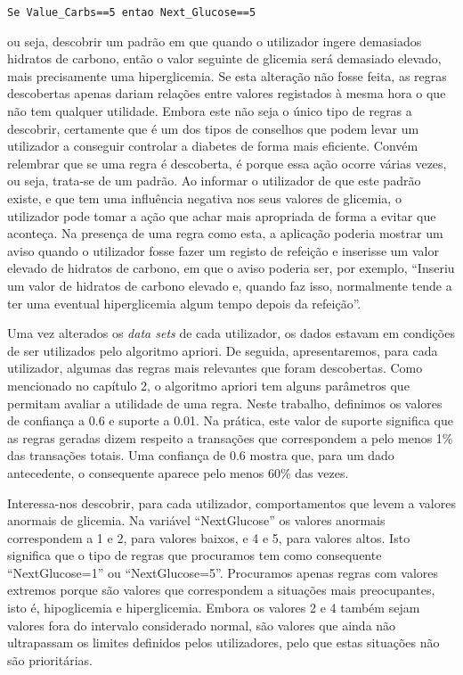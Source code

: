 \begin{lstlisting}
Se Value_Carbs==5 entao Next_Glucose==5
\end{lstlisting} 
ou seja, descobrir um padrão em que quando o utilizador ingere demasiados hidratos de carbono, então o valor seguinte de glicemia será demasiado elevado, mais precisamente uma hiperglicemia. Se esta alteração não fosse feita, as regras descobertas apenas dariam relações entre valores registados à mesma hora o que não tem qualquer utilidade. Embora este não seja o único tipo de regras a descobrir, certamente que é um dos tipos de conselhos que podem levar um utilizador a conseguir controlar a diabetes de forma mais eficiente. Convém relembrar que se uma regra é descoberta, é porque essa ação ocorre várias vezes, ou seja, trata-se de um padrão. Ao informar o utilizador de que este padrão existe, e que tem uma influência negativa nos seus valores de glicemia, o utilizador pode tomar a ação que achar mais apropriada de forma a evitar que aconteça. Na presença de uma regra como esta, a aplicação poderia mostrar um aviso quando o utilizador fosse fazer um registo de refeição e inserisse um valor elevado de hidratos de carbono, em que o aviso poderia ser, por exemplo, ``Inseriu um valor de hidratos de carbono elevado e, quando faz isso, normalmente tende a ter uma eventual hiperglicemia algum tempo depois da refeição''.

Uma vez alterados os \textit{data sets} de cada utilizador, os dados estavam em condições de ser utilizados pelo algoritmo apriori. De seguida, apresentaremos, para cada utilizador, algumas das regras mais relevantes que foram descobertas. Como mencionado no capítulo 2, o algoritmo apriori tem alguns parâmetros que permitam avaliar a utilidade de uma regra. Neste trabalho, definimos os valores de confiança a 0.6 e suporte a 0.01. Na prática, este valor de suporte significa que as regras geradas dizem respeito a transações que correspondem a pelo menos 1\% das transações totais. Uma confiança de 0.6 mostra que, para um dado antecedente, o consequente aparece pelo menos 60\% das vezes.

Interessa-nos descobrir, para cada utilizador, comportamentos que levem a valores anormais de glicemia. Na variável ``Next\textunderscore Glucose'' os valores anormais correspondem a 1 e 2, para valores baixos, e 4 e 5, para valores altos. Isto significa que o tipo de regras que procuramos tem como consequente ``Next\textunderscore Glucose=1'' ou ``Next\textunderscore Glucose=5''. Procuramos apenas regras com valores extremos porque são valores que correspondem a situações mais preocupantes, isto é, hipoglicemia e hiperglicemia. Embora os valores 2 e 4 também sejam valores fora do intervalo considerado normal, são valores que ainda não ultrapassam os limites definidos pelos utilizadores, pelo que estas situações não são prioritárias. 

